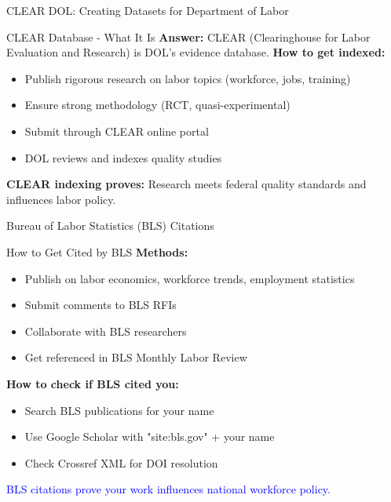 \documentclass[11pt]{beamer}
\begin{document}
	\begin{frame}{CLEAR DOL: Creating Datasets for Department of Labor}
		\small
		\begin{block}{CLEAR Database - What It Is}
			\textbf{Answer:} CLEAR (Clearinghouse for Labor Evaluation and Research) is DOL's evidence database.
			\vspace{0.1cm}
			\textbf{How to get indexed:}
			\begin{itemize}
				\item Publish rigorous research on labor topics (workforce, jobs, training)
				\item Ensure strong methodology (RCT, quasi-experimental)
				\item Submit through CLEAR online portal
				\item DOL reviews and indexes quality studies
			\end{itemize}
			\textbf{CLEAR indexing proves:} Research meets federal quality standards and influences labor policy.
		\end{block}
	\end{frame}
	
	\begin{frame}{Bureau of Labor Statistics (BLS) Citations}
		\small
		\begin{block}{How to Get Cited by BLS}
			\textbf{Methods:}
			\begin{itemize}
				\item Publish on labor economics, workforce trends, employment statistics
				\item Submit comments to BLS RFIs
				\item Collaborate with BLS researchers
				\item Get referenced in BLS Monthly Labor Review
			\end{itemize}
			\textbf{How to check if BLS cited you:}
			\begin{itemize}
				\item Search BLS publications for your name
				\item Use Google Scholar with "site:bls.gov" + your name
				\item Check Crossref XML for DOI resolution
			\end{itemize}
			\textcolor{blue}{BLS citations prove your work influences national workforce policy.}
		\end{block}
	\end{frame}
	
\end{document}
